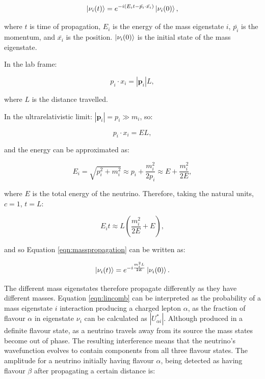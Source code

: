 \begin{equation}
\ket{\nu_{i}(t)}=e^{-i(E_{i}t-\bar{p_i}\cdot\bar{x_i})}\ket{\nu_i(0)},
\label{eqn:masspropagation}
\end{equation}

where $t$ is time of propagation, $E_i$ is the energy of the mass eigenstate $i$, $\bar{p_i}$ is the momentum, and $\bar{x_i}$ is the position. $\ket{\nu_i(0)}$ is the initial state of the mass eigenstate.

In the lab frame:

\begin{equation}
p_i\cdot x_i = |\mathbf{p}_i|L,
\end{equation}

where $L$ is the distance travelled.

In the ultrarelativistic limit: $|\mathbf{p}_i| = p_i \gg m_i$, so:

\begin{equation}
 p_i\cdot x_i  = EL,
\end{equation}

and the energy can be approximated as:

\begin{equation}
E_{i} = \sqrt{p_i^2 + m_i^2} \approx p_i + \frac{m_i^2}{2p_i} \approx E + \frac{m_i^2}{2E},
\end{equation}

where $E$ is the total energy of the neutrino. Therefore, taking the natural units, $c=1$, $t=L$:

\begin{equation}
E_i t\approx L(\frac{m_i^2}{2E}+E),
\end{equation}

and so Equation \eqref{eqn:masspropagation} can be written as:

\begin{equation}
\ket{\nu_{i}(t)}=e^{-i\frac{m_i^2L}{2E}}\ket{\nu_i(0)}.
\end{equation}

The different mass eigenstates therefore propagate differently as they have different masses. Equation \eqref{eqn:lincomb} can be interpreted as the probability of a mass eigenstate $i$ interaction producing a charged lepton $\alpha$, as the fraction of flavour $\alpha$ in eigenstate $\nu_i$ can be calculated as $|U^\text{*}_{\alpha i}|$.  Although produced in a definite flavour state, as a neutrino travels away from its source the mass states become out of phase. The resulting interference means that the neutrino's wavefunction evolves to contain components from all three flavour states. The amplitude for a neutrino initially having flavour $\alpha$, being detected as having flavour $\beta$ after propagating a certain distance is:

